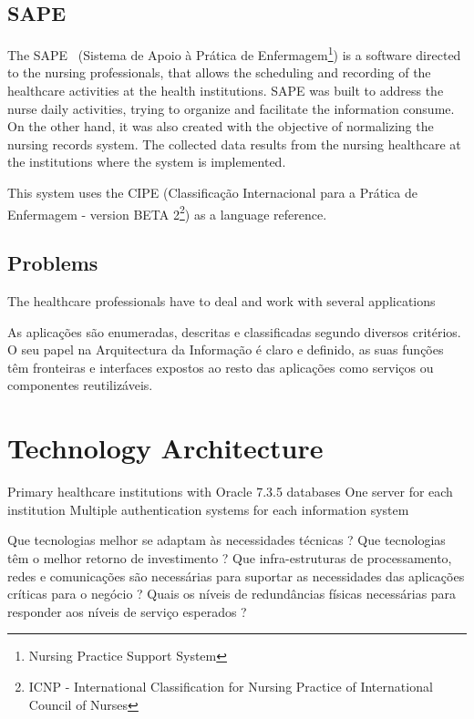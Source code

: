 \subsection{SAPE}
The SAPE~\citep{ACSS_SAPE2010} (Sistema de Apoio à Prática de Enfermagem\footnote{Nursing Practice Support System}) is a software directed to the nursing professionals, that allows the scheduling and recording of the healthcare activities at the health institutions. SAPE was built to address the nurse daily activities, trying to organize and facilitate the information consume. On the other hand, it was also created with the objective of normalizing the nursing records system. The collected data results from the nursing healthcare at the institutions where the system is implemented.

This system uses the CIPE (Classificação Internacional para a Prática de Enfermagem - version BETA 2\footnote{ICNP - International Classification for Nursing Practice of International Council of Nurses}) as a language reference. 


\subsection{Problems}

The healthcare professionals have to deal and work with several applications

As aplicações são enumeradas, descritas e classificadas segundo diversos critérios. O seu papel na Arquitectura da Informação é claro e definido, as suas funções têm fronteiras e interfaces expostos ao resto das aplicações como serviços ou componentes reutilizáveis.


\section{Technology Architecture}

Primary healthcare institutions with Oracle 7.3.5 databases
One server for each institution
Multiple authentication systems for each information system

Que tecnologias melhor se adaptam às necessidades técnicas ? Que tecnologias têm o melhor retorno de investimento ? Que infra-estruturas de processamento, redes e comunicações são necessárias para suportar as necessidades das aplicações críticas para o negócio ? Quais os níveis de redundâncias físicas necessárias para responder aos níveis de serviço esperados ?
